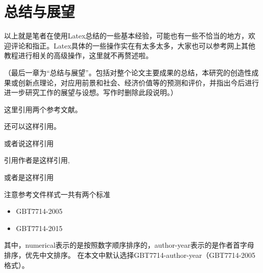 \chapter{总结与展望}


以上就是笔者在使用Latex总结的一些基本经验，可能也有一些不恰当的地方，欢迎评论和指正。Latex具体的一些操作实在有太多太多，大家也可以参考网上其他教程进行相关的高级操作，这里就不再赘述啦。

（最后一章为“总结与展望”。包括对整个论文主要成果的总结，本研究的创造性成果或创新点理论，对应用前景和社会、经济价值等的预测和评价，并指出今后进行进一步研究工作的展望与设想。写作时删除此段说明。）

这里引用两个参考文献\cite{2001Applying}\cite{2004PSO_ZhangLibiao}。

还可以这样引用\cite{2001Applying,2021A}。

或者说这样引用\cite{2001Applying,2004PSO_ZhangLibiao,2021A}

引用作者是这样引用\citet{2001Applying},\citet{2004PSO_ZhangLibiao}

或者是这样引用\citep{2001Applying}

注意参考文件样式一共有两个标准

\begin{itemize}
    \item GBT7714-2005
    \item GBT7714-2015
\end{itemize}

其中，numerical表示的是按照数字顺序排序的，author-year表示的是作者首字母排序，优先中文排序。
在本文中默认选择GBT7714-author-year（GBT7714-2005格式）。
